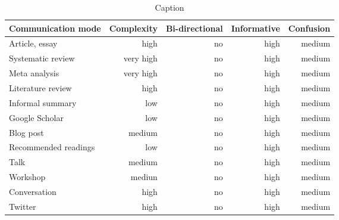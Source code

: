 \begin{table*}\centering
{}
\begin{tabular}{@{}lrrrr@{}}\toprule
Communication mode & Complexity & Bi-directional & Informative  & Confusion
\\\midrule
Article, essay      & high & no & high & medium  \\
Systematic review   & very high & no & high & medium\\
Meta analysis       & very high & no & high & medium\\
Literature review   & high & no & high & medium\\
Informal summary    & low & no & high & medium\\
Google Scholar      & low & no & high & medium\\
Blog post           & medium & no & high & medium\\
Recommended readings& low & no & high & medium\\
Talk                & medium & no & high & medium\\
Workshop            & mediun & no & high & medium\\
Conversation        & high & no & high & medium\\
Twitter             & high & no & high & medium\\
\bottomrule
\end{tabular}
\caption{Caption}
\end{table*}